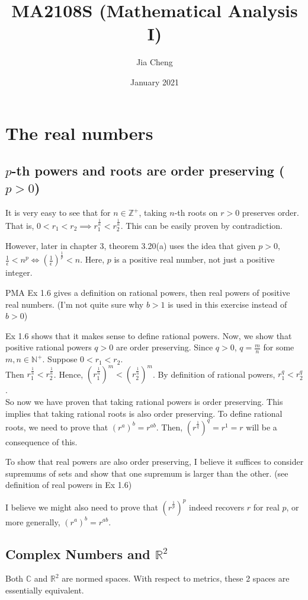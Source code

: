 \documentclass{article}
\title{MA2108S (Mathematical Analysis I)}
\author{Jia Cheng}
\date{January 2021}
\begin{document}
\maketitle

\section{The real numbers}
\subsection{$p$-th powers and roots are order preserving ($p > 0$)}
It is very easy to see that for $n\in \mathbb{Z}^+$, taking $n$-th roots on $r>0$ preserves order. That is, $0 < r_1 < r_2 \implies r_1^{\frac{1}{n}} < r_2^\frac{1}{n}$. This can be easily proven by contradiction.

However, later in chapter 3, theorem 3.20(a) uses the idea that given $p>0$, $\frac{1}{\epsilon} < n^p \iff (\frac{1}{\epsilon})^\frac{1}{p} < n$. Here, $p$ is a positive real number, not just a positive integer.


PMA Ex 1.6 gives a definition on rational powers, then real powers of positive real numbers. (I'm not quite sure why $b>1$ is used in this exercise instead of $b>0$)

Ex 1.6 shows that it makes sense to define rational powers. Now, we show that positive rational powers $q > 0$ are order preserving. Since $q>0$, $q=\frac{m}{n}$ for some $m,n\in \mathbb{N}^+$. Suppose $0<r_1<r_2$.\\
Then $r_1^\frac{1}{n} < r_2^\frac{1}{n}$. Hence, $(r_1^\frac{1}{n})^m < (r_2^\frac{1}{n})^m$. By definition of rational powers, $r_1^q < r_2^q$.\\
So now we have proven that taking rational powers is order preserving. This implies that taking rational roots is also order preserving. To define rational roots, we need to prove that $(r^a)^b=r^{ab}$. Then, $(r^\frac{1}{q})^q=r^1=r$ will be a consequence of this.

To show that real powers are also order preserving, I believe it suffices to consider supremums of sets and show that one supremum is larger than the other. (see definition of real powers in Ex 1.6)

I believe we might also need to prove that $(r^\frac{1}{p})^p$ indeed recovers $r$ for real $p$, or more generally, $(r^a)^b=r^{ab}$.

\subsection{Complex Numbers and $\mathbb{R}^2$}
Both $\mathbb{C}$ and $\mathbb{R}^2$ are normed spaces. With respect to metrics, these 2 spaces are essentially equivalent. 
\end{document}
